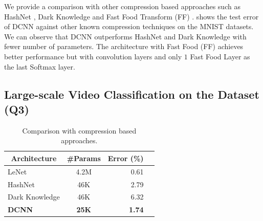 We provide a comparison with other compression based approaches such as HashNet \cite{chen2015compressing}, Dark Knowledge \cite{hinton2015distilling} and Fast Food Transform (FF) \cite{yang2015deep}. 
 shows the test error of DCNN against other known compression techniques on the MNIST datasets.
We can observe that DCNN outperforms HashNet \cite{chen2015compressing} and Dark Knowledge \cite{hinton2015distilling} with fewer number of parameters.
The architecture with Fast Food (FF) \cite{yang2015deep} achieves better performance but with convolution layers and only $1$ Fast Food Layer as the last Softmax layer. 

\subsection{Large-scale Video Classification on the \yt Dataset (Q3)}
\label{subsection:ch4-large_scale_video_classification}

\begin{table}[ht]
  \centering
    \begin{tabular}{lcrc}
    \toprule
    \multicolumn{1}{c}{\textbf{Architecture}} & \multicolumn{1}{c}{\textbf{\#Params}} & \textbf{Error (\%)} \\
    \midrule
    LeNet \cite{lecun1998gradient}             & 4.2M         & 0.61          \\
    HashNet \cite{chen2015compressing}         & 46K          & 2.79          \\
    Dark Knowledge \cite{hinton2015distilling} & 46K          & 6.32          \\
    \textbf{DCNN}                              & \textbf{25K} & \textbf{1.74} \\
    \bottomrule
    \end{tabular}%
    \caption{Comparison with compression based approaches.}
  \label{table:ch4-mnist}%
\end{table}%



